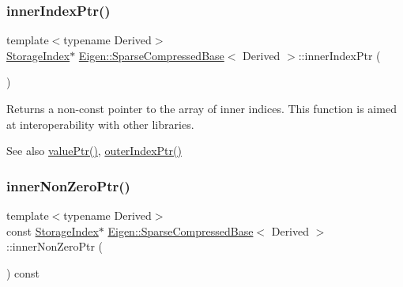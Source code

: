 \subsubsection{\texorpdfstring{innerIndexPtr()}{innerIndexPtr()}\hspace{0.1cm}{\footnotesize\ttfamily [2/2]}}
{\footnotesize\ttfamily template$<$typename Derived$>$ \\
\mbox{\hyperlink{class_eigen_1_1_sparse_matrix_base_a0b540ba724726ebe953f8c0df06081ed}{Storage\+Index}}$\ast$ \mbox{\hyperlink{class_eigen_1_1_sparse_compressed_base}{Eigen\+::\+Sparse\+Compressed\+Base}}$<$ Derived $>$\+::inner\+Index\+Ptr (\begin{DoxyParamCaption}{ }\end{DoxyParamCaption})\hspace{0.3cm}{\ttfamily [inline]}}

\begin{DoxyReturn}{Returns}
a non-\/const pointer to the array of inner indices. This function is aimed at interoperability with other libraries. 
\end{DoxyReturn}
\begin{DoxySeeAlso}{See also}
\mbox{\hyperlink{class_eigen_1_1_sparse_compressed_base_a0f12f72d14b6c277d09be9f5ce2eab95}{value\+Ptr()}}, \mbox{\hyperlink{class_eigen_1_1_sparse_compressed_base_a53a82f962686e18c8dc07a4b9a85ed7b}{outer\+Index\+Ptr()}} 
\end{DoxySeeAlso}
\mbox{\label{class_eigen_1_1_sparse_compressed_base_afc056a3895eae1a4c4767252ff04966a}} 
\subsubsection{\texorpdfstring{innerNonZeroPtr()}{innerNonZeroPtr()}\hspace{0.1cm}{\footnotesize\ttfamily [1/2]}}
{\footnotesize\ttfamily template$<$typename Derived$>$ \\
const \mbox{\hyperlink{class_eigen_1_1_sparse_matrix_base_a0b540ba724726ebe953f8c0df06081ed}{Storage\+Index}}$\ast$ \mbox{\hyperlink{class_eigen_1_1_sparse_compressed_base}{Eigen\+::\+Sparse\+Compressed\+Base}}$<$ Derived $>$\+::inner\+Non\+Zero\+Ptr (\begin{DoxyParamCaption}{ }\end{DoxyParamCaption}) const\hspace{0.3cm}{\ttfamily [inline]}}


